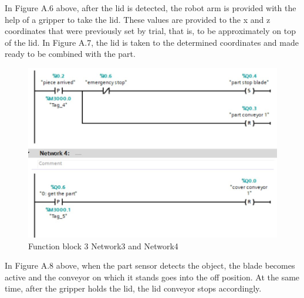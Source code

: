 In Figure A.6 above, after the lid is detected, the robot arm is provided with the help of a gripper to take the lid. These values ​​are provided to the x and z coordinates that were previously set by trial, that is, to be approximately on top of the lid.
In Figure A.7, the lid is taken to the determined coordinates and made ready to be combined with the part.

\begin{figure}[H]
    \centering
    \includegraphics[width=0.60\columnwidth]{imgs/io/tia5.3.jpg}
    \caption[Function block 3 Network3 and Network4]{Function block 3 Network3 and Network4}
    \label{fig-magnitude}
\end{figure}%

In Figure A.8 above, when the part sensor detects the object, the blade becomes active and the conveyor on which it stands goes into the off position. At the same time, after the gripper holds the lid, the lid conveyor stops accordingly.

